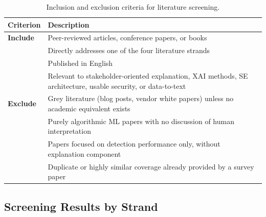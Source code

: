 \begin{table}[h]
\centering
\begin{tabular}{@{}lp{}@{}}
\toprule
\textbf{Criterion} & \textbf{Description} \\
\midrule
\textbf{Include} & Peer-reviewed articles, conference papers, or books \\
                 & Directly addresses one of the four literature strands \\
                 & Published in English \\
                 & Relevant to stakeholder-oriented explanation, XAI methods, SE architecture, usable security, or data-to-text \\
\midrule
\textbf{Exclude} & Grey literature (blog posts, vendor white papers) unless no academic equivalent exists \\
                 & Purely algorithmic ML papers with no discussion of human interpretation \\
                 & Papers focused on detection performance only, without explanation component \\
                 & Duplicate or highly similar coverage already provided by a survey paper \\
\bottomrule
\end{tabular}
\caption{Inclusion and exclusion criteria for literature screening.}
\label{tab:screening-criteria}
\end{table}

\subsection*{Screening Results by Strand}

